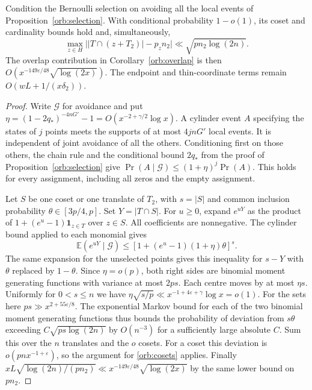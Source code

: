 \begin{corollary}\label{orb:conditional-overlap}
Condition the Bernoulli selection on avoiding all the local events of
Proposition~\ref{orb:selection}. With conditional probability
\(1-o(1)\), its coset and cardinality bounds hold and, simultaneously,
\[
 \max_{z\in H}\big||T\cap(z+T_2)|-p_z n_2\big|
    \ll \sqrt{pn_2\log(2n)}.
\]
The overlap contribution in Corollary~\ref{orb:overlap} is then
\(O(x^{-149\varepsilon/48}\sqrt{\log(2x)})\). The endpoint and
thin-coordinate terms remain \(O(wL+1/(x\delta_2))\).
\end{corollary}
\begin{proof}
Write \(\mathcal G\) for avoidance and put
\(\eta=(1-2q_*)^{-4nG'}-1=O(x^{-2+\gamma/2}\log x)\).
A cylinder event \(A\) specifying the states of \(j\) points meets
the supports of at most \(4jnG'\) local events. It is independent of
joint avoidance of all the others. Conditioning first on those others,
the chain rule and the conditional bound \(2q_*\) from the proof of
Proposition~\ref{orb:selection} give
\(\Pr(A\mid\mathcal G)\le(1+\eta)^j\Pr(A)\). This holds for
every assignment, including all zeros and the empty assignment.

Let \(S\) be one coset or one translate of \(T_2\), with \(s=|S|\)
and common inclusion probability \(\theta\in[3p/4,p]\).
Set \(Y=|T\cap S|\). For \(u\ge0\), expand \(e^{uY}\) as the product
of \(1+(e^u-1)\mathbf1_{z\in T}\) over \(z\in S\). All coefficients
are nonnegative. The cylinder bound applied to each monomial gives
\[
 \mathbb E(e^{uY}\mid\mathcal G)
 \le [1+(e^u-1)(1+\eta)\theta]^s.
\]
The same expansion for the unselected points gives this inequality
for \(s-Y\) with \(\theta\) replaced by \(1-\theta\). Since
\(\eta=o(p)\), both right sides are binomial moment generating
functions with variance at most \(2ps\). Each centre moves by at most
\(\eta s\). Uniformly for \(0<s\le n\) we have
\(\eta\sqrt{s/p}\ll x^{-1+4\varepsilon+\gamma}\log x=o(1)\).
For the sets here \(ps\gg x^{2+55\varepsilon/8}\). The exponential
Markov bound for each of the two binomial moment generating functions
thus bounds the probability of deviation from \(s\theta\) exceeding
\(C\sqrt{ps\log(2n)}\) by \(O(n^{-3})\) for a sufficiently large
absolute \(C\). Sum this over the \(n\) translates and the \(o\)
cosets. For a coset this deviation is \(o(pn x^{-1+\varepsilon})\),
so the argument for \eqref{orb:cosets} applies. Finally
\(xL\sqrt{\log(2n)/(pn_2)}\ll
x^{-149\varepsilon/48}\sqrt{\log(2x)}\) by the same lower bound on
\(pn_2\).
\end{proof}

